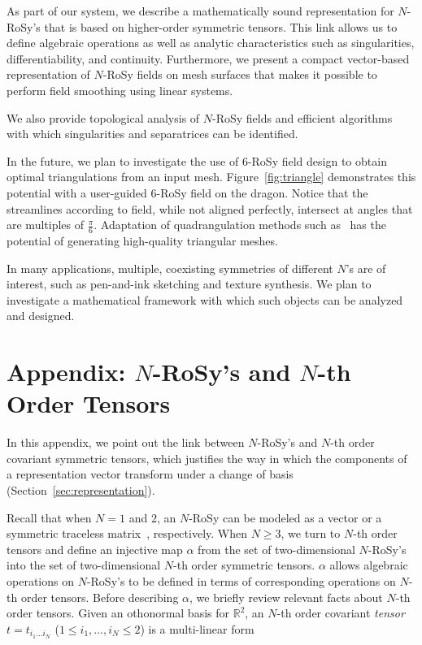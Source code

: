 \documentclass{acmsiggraph}               %
\begin{document}
As part of our system, we describe a mathematically sound
representation for $N$-RoSy's that is based on higher-order
symmetric tensors. This link allows us to define algebraic
operations as well as analytic characteristics such as
singularities, differentiability, and continuity. Furthermore, we
present a compact vector-based representation of $N$-RoSy fields on
mesh surfaces that makes it possible to perform field smoothing
using linear systems.

We also provide topological analysis of $N$-RoSy fields and
efficient algorithms with which singularities and separatrices can
be identified.

In the future, we plan to investigate the use of $6$-RoSy field
design to obtain optimal triangulations from an input mesh.
Figure~\ref{fig:triangle} demonstrates this potential with a
user-guided $6$-RoSy field on the dragon. Notice that the
streamlines according to field, while not aligned perfectly,
intersect at angles that are multiples of $\frac{\pi}{6}$.
Adaptation of quadrangulation methods such as~\cite{Ray:06,Tong:06}
has the potential of generating high-quality triangular meshes.

In many applications, multiple, coexisting symmetries of different
$N$'s are of interest, such as pen-and-ink sketching and texture
synthesis. We plan to investigate a mathematical framework with
which such objects can be analyzed and designed.

\section*{Appendix: $N$-RoSy's and $N$-th Order Tensors}
\label{sec:higher_tensors}

In this appendix, we point out the link between $N$-RoSy's and
$N$-th order covariant symmetric tensors, which justifies the way in
which the components of a representation vector transform under a
change of basis (Section~\ref{sec:representation}).

Recall that when $N=1$ and $2$, an $N$-RoSy can be modeled as a
vector or a symmetric traceless matrix~\cite{Zhang:07},
respectively. When $N \ge 3$, we turn to $N$-th order tensors and
define an injective map $\alpha$ from the set of two-dimensional
$N$-RoSy's into the set of two-dimensional $N$-th order symmetric
tensors. $\alpha$ allows algebraic operations on $N$-RoSy's to be
defined in terms of corresponding operations on $N$-th order
tensors. Before describing $\alpha$, we briefly review relevant
facts about $N$-th order tensors. Given an othonormal basis for
$\mathbb{R}^2$, an $N$-th order covariant {\em tensor} $t=t_{i_1 ...
i_N}$ ($1 \le i_1, ..., i_N \le 2$) is a multi-linear form
\end{document}
